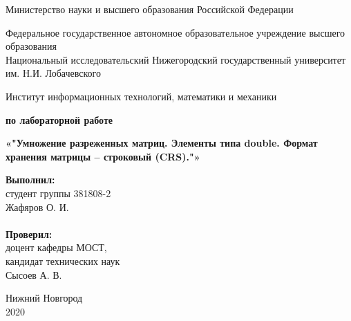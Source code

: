 \documentclass{report}
\begin{document}
\begin{titlepage}

\begin{center}
Министерство науки и высшего образования Российской Федерации
\end{center}

\begin{center}
Федеральное государственное автономное образовательное учреждение высшего образования \\
Национальный исследовательский Нижегородский государственный университет им. Н.И. Лобачевского
\end{center}

\begin{center}
Институт информационных технологий, математики и механики
\end{center}

\vspace{4em}

\begin{center}
\textbf{ по лабораторной работе} \\
\end{center}
\begin{center}
\textbf{\Large«"Умножение разреженных матриц. Элементы типа double. 
Формат хранения матрицы – строковый (CRS)."»} \\
\end{center}

\vspace{4em}

\newbox{\lbox}
\newlength{\maxl}
\setlength{\maxl}{\wd\lbox}
\hfill\parbox{7cm}{
\hspace*{5cm}\hspace*{-5cm}\textbf{Выполнил:} \\ студент группы 381808-2 \\ Жафяров О. И.\\
\\
\hspace*{5cm}\hspace*{-5cm}\textbf{Проверил:}\\ доцент кафедры МОСТ, \\ кандидат технических наук \\ Сысоев А. В.\\
}
\vspace{\fill}

\begin{center} Нижний Новгород \\ 2020 \end{center}

\end{titlepage}
\end{document}
